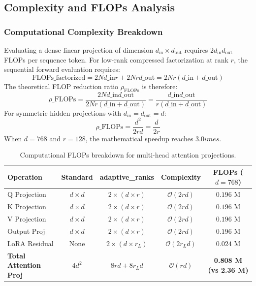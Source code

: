 \subsection{Complexity and FLOPs Analysis}
\subsubsection{Computational Complexity Breakdown}
Evaluating a dense linear projection of dimension $d_{\text{in}} \times d_{\text{out}}$ requires $2 d_{\text{in}} d_{\text{out}}$ FLOPs per sequence token. For low-rank compressed factorization at rank $r$, the sequential forward evaluation requires:
\[
\text{FLOPs}\_{\text{factorized}} = 2 N d\_{\text{in}} r + 2 N r d\_{\text{out}} = 2 N r (d\_{\text{in}} + d\_{\text{out}})
\]
The theoretical FLOP reduction ratio $\rho_{\text{FLOPs}}$ is therefore:
\[
\rho\_{\text{FLOPs}} = \frac{2 N d\_{\text{in}} d\_{\text{out}}}{2 N r (d\_{\text{in}} + d\_{\text{out}})} = \frac{d\_{\text{in}} d\_{\text{out}}}{r (d\_{\text{in}} + d\_{\text{out}})}
\]
For symmetric hidden projections with $d_{\text{in}} = d_{\text{out}} = d$:
\[
\rho\_{\text{FLOPs}} = \frac{d^2}{2 r d} = \frac{d}{2 r}
\]
When $d = 768$ and $r = 128$, the mathematical speedup reaches $3.0	imes$.

\begin{table}[H]
\centering
\small
\begin{tabular}{lcccc}
\toprule
\textbf{Operation} & \textbf{Standard} & \textbf{adaptive\_ranks} & \textbf{Complexity} & \textbf{FLOPs ($d=768$)} \\
\midrule
Q Projection & $d \times d$ & $2 \times (d \times r)$ & $\mathcal{O}(2rd)$ & $0.196$ M \\
K Projection & $d \times d$ & $2 \times (d \times r)$ & $\mathcal{O}(2rd)$ & $0.196$ M \\
V Projection & $d \times d$ & $2 \times (d \times r)$ & $\mathcal{O}(2rd)$ & $0.196$ M \\
Output Proj & $d \times d$ & $2 \times (d \times r)$ & $\mathcal{O}(2rd)$ & $0.196$ M \\
LoRA Residual & None & $2 \times (d \times r_L)$ & $\mathcal{O}(2r_L d)$ & $0.024$ M \\
\midrule
\textbf{Total Attention Proj} & $4 d^2$ & $8rd + 8r_L d$ & $\mathcal{O}(rd)$ & \textbf{0.808 M (vs 2.36 M)} \\
\bottomrule
\end{tabular}
\caption{Computational FLOPs breakdown for multi-head attention projections.}
\end{table}

